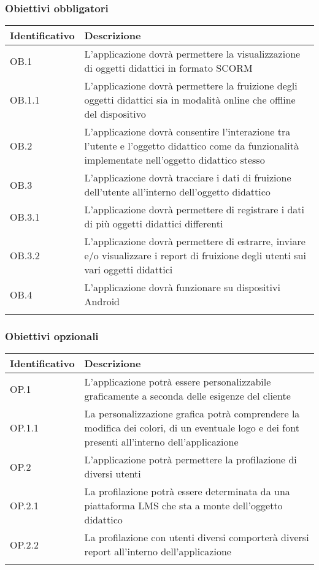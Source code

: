 \documentclass[../Tesi.tex]{subfiles}
\begin{document}
		\subsubsection{Obiettivi obbligatori}
			\begin{longtabu} to \textwidth {X[0.3cm] X}
				\toprule
				\textbf{Identificativo} & \textbf{Descrizione} \\
				\midrule
				\endhead
				OB.1 & L’applicazione dovrà permettere la visualizzazione di oggetti didattici in formato SCORM \\
				\midrule
				OB.1.1 & L’applicazione dovrà permettere la fruizione degli oggetti didattici sia in modalità online che offline del dispositivo \\
				\midrule
				OB.2 & L’applicazione dovrà consentire l’interazione tra l’utente e l’oggetto didattico come da funzionalità implementate nell’oggetto didattico stesso \\
				\midrule
				OB.3 & L’applicazione dovrà tracciare i dati di fruizione dell’utente all’interno dell’oggetto didattico \\
				\midrule
				OB.3.1 & L’applicazione dovrà permettere di registrare i dati di più oggetti didattici differenti \\
				\midrule
				OB.3.2 & L’applicazione dovrà permettere di estrarre, inviare e/o visualizzare i report di fruizione degli utenti sui vari oggetti didattici \\
				\midrule
				OB.4 & L’applicazione dovrà funzionare su dispositivi Android \\
				\bottomrule
			\end{longtabu}

			\subsubsection{Obiettivi opzionali}
			\begin{longtabu} to \textwidth {X[0.3cm] X}
				\toprule
				\textbf{Identificativo} & \textbf{Descrizione} \\
				\midrule
				\endhead
				OP.1 & L’applicazione potrà essere personalizzabile graficamente a seconda delle esigenze del cliente  \\
				\midrule
				OP.1.1 & La personalizzazione grafica potrà comprendere la modifica dei colori, di un eventuale logo e dei font presenti all’interno dell’applicazione  \\
				\midrule
				OP.2 & L’applicazione potrà permettere la profilazione di diversi utenti  \\
				\midrule
				OP.2.1 & La profilazione potrà essere determinata da una piattaforma LMS che sta a monte dell’oggetto didattico  \\
				\midrule
				OP.2.2 & La profilazione con utenti diversi comporterà diversi report all’interno dell’applicazione \\
				\bottomrule
			\end{longtabu}
\end{document}
